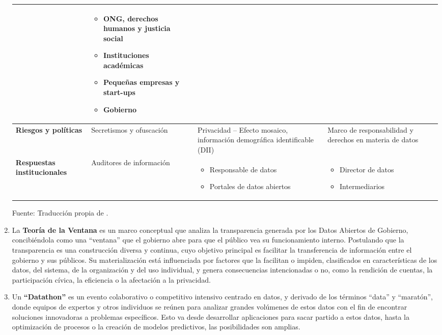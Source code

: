 \begin{enumerate}
\begin{table}[ht]
{\begin{tabular}{|p{3cm}|p{4cm}|p{4cm}|p{5cm}|}
				& 
				\begin{itemize}
					\item ONG, derechos humanos y justicia social
					\item Instituciones académicas
					\item Pequeñas empresas y start-ups
					\item Gobierno
				\end{itemize} \\
				\hline
				\textbf{Riesgos y políticas} & Secretismos y ofuscación & Privacidad -- Efecto mosaico, información demográfica identificable (DII) & Marco de responsabilidad y derechos en materia de datos \\
				\hline
				\textbf{Respuestas institucionales} & Auditores de información & 
				\begin{itemize}
					\item Responsable de datos
					\item Portales de datos abiertos
				\end{itemize}
				& 
				\begin{itemize}
					\item Director de datos
					\item Intermediarios
				\end{itemize} \\
				\hline
			\end{tabular}
		}
		\vspace{0.5em}
		
		\footnotesize Fuente: Traducción propia de \cite{verhulst2020}.
	\end{table}

	\item La \textbf{Teoría de la Ventana} \label{def6} \citep{Matheus03052020} es un marco conceptual que analiza la transparencia generada por los Datos Abiertos de Gobierno, concibiéndola como una ``ventana'' que el gobierno abre para que el público vea su funcionamiento interno. Postulando que la transparencia es una construcción diversa y continua, cuyo objetivo principal es facilitar la transferencia de información entre el gobierno y sus públicos. Su materialización está influenciada por factores que la facilitan o impiden, clasificados en características de los datos, del sistema, de la organización y del uso individual, y genera consecuencias intencionadas o no, como la rendición de cuentas, la participación cívica, la eficiencia o la afectación a la privacidad.
	
	\item Un \textbf{``Datathon''} \label{def7} \citep{Datathon2016Anslow} es un evento colaborativo o competitivo intensivo centrado en datos, y derivado de los términos ``data'' y ``maratón'', donde equipos de expertos y otros individuos se reúnen para analizar grandes volúmenes de estos datos con el fin de encontrar soluciones innovadoras a problemas específicos. Esto va desde desarrollar aplicaciones para sacar partido a estos datos, hasta la optimización de procesos o la creación de modelos predictivos, las posibilidades son amplias.
	
	
\end{enumerate}
